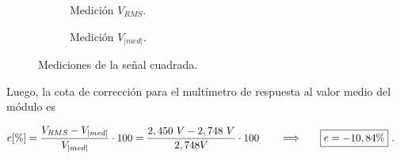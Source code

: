       \begin{figure}[H]
        \centering
        \begin{subfigure}[ht]{0.48\textwidth}
          \caption{Medición $V_{RMS}$.}
          \label{fig:MedicionVrmsCuadrada}
        \end{subfigure}
        \hfill 
        \begin{subfigure}[ht]{0.48\textwidth}
          \caption{Medición $V_{|med|}$.}
          \label{fig:MedicionVmedCuadrada}
        \end{subfigure}
        \caption{Mediciones de la señal cuadrada.}
         \label{fig:MedicionSeñalCuadrada}
      \end{figure}


      Luego, la cota de corrección para el multímetro de respuesta al valor medio del módulo es

      \begin{align*}
        e [\%] = \dfrac{V_{RMS} - V_{|med|}}{V_{|med|}} \cdot 100
               = \dfrac{2,450~V - 2,748~V}{2,748V} \cdot 100
               \hspace{20pt} \Longrightarrow \hspace{20pt} \Aboxed{e = -10,84\%}~.
      \end{align*}


